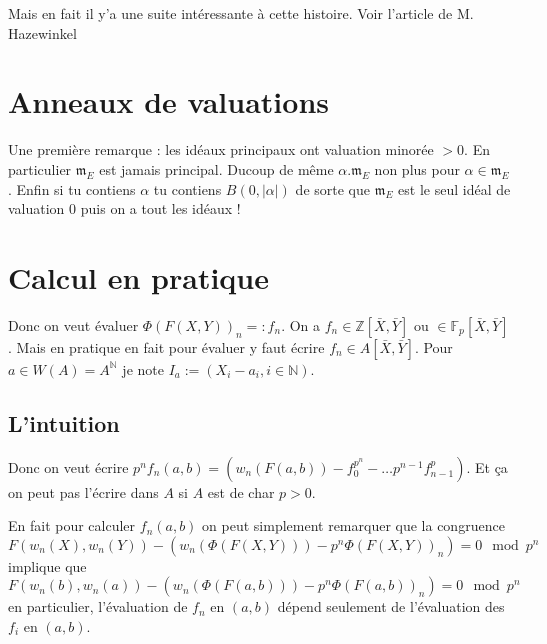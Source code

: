 \documentclass[a4paper,12pt]{article}
\newcommand{\Z}{\mathbb{Z}}
\newcommand{\N}{\mathbb{N}}
\newcommand{\F}{\mathbb F}
\newcommand{\m}{\mathfrak m}
\theoremstyle{plain}
\theoremstyle{definition}
\theoremstyle{remark}
\begin{document}
Mais en fait il y'a une suite intéressante à cette histoire. 
Voir l'article de M. Hazewinkel

\section{Anneaux de valuations}
Une première remarque : les idéaux principaux ont valuation
minorée $>0$. En particulier $\m_E$ est jamais principal. Ducoup
de même $\alpha.\m_E$ non plus pour $\alpha\in \m_E$. Enfin si
tu contiens $\alpha$ tu contiens $B(0, |\alpha|)$ de sorte que
$\m_E$ est le seul idéal de valuation $0$ puis on a tout les
idéaux !


\section{Calcul en pratique}\label{calcul}
Donc on veut évaluer $\Phi(F(X,Y))_n=:f_n$. On a $f_n\in \Z[\bar X,
\bar Y]$ ou $\in \F_p[\bar X,\bar Y]$. Mais en pratique en fait
pour évaluer y faut écrire $f_n\in A[\bar X,\bar Y]$. Pour 
$a\in W(A)=A^\N$ je note $I_a:=(X_i-a_i,i\in \N)$.

\subsection{L'intuition}
Donc on veut écrire 
$p^nf_n(a,b)=(w_n(F(a,b))-f_0^{p^n}-\ldots p^{n-1}f_{n-1}^p)$.
Et ça on peut pas l'écrire dans $A$ si $A$ est de char $p>0$.

En fait pour calculer $f_n(a,b)$ on peut simplement remarquer que
la congruence 
\[F(w_n(X),w_n(Y))-(w_n(\Phi(F(X,Y)))-p^n\Phi(F(X,Y))_n)
=0\mod p^n\]
implique que 
\[F(w_n(b),w_n(a))-(w_n(\Phi(F(a,b)))-p^n\Phi(F(a,b))_n)
=0\mod p^n\]
en particulier, l'évaluation de $f_n$ en $(a,b)$ dépend seulement
de l'évaluation des $f_i$ en $(a,b)$.
\end{document}
